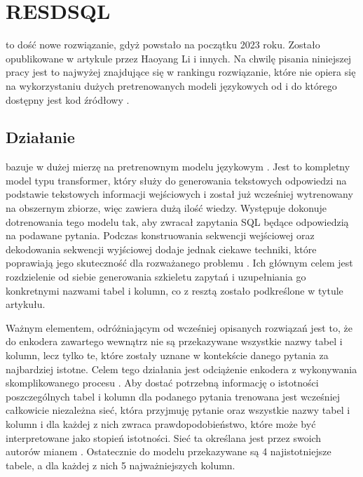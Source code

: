 \section{RESDSQL}
 to dość nowe rozwiązanie, gdyż powstało na początku 2023 roku. Zostało opublikowane w artykule  \cite{Li2023resdsql} przez Haoyang Li i innych. Na chwilę pisania niniejszej pracy jest to najwyżej znajdujące się w rankingu  rozwiązanie, które nie opiera się na wykorzystaniu dużych pretrenowanych modeli językowych od  i do którego dostępny jest kod źródłowy \cite{resdsql-repository}.

\subsection{Działanie}
 bazuje w dużej mierzę na pretrenownym modelu językowym  \cite{Raffel2019}. Jest to kompletny model typu transformer, który służy do generowania tekstowych odpowiedzi na podstawie tekstowych informacji wejściowych i został już wcześniej wytrenowany na obszernym zbiorze, więc zawiera dużą ilość wiedzy. Występuje   dokonuje dotrenowania tego modelu tak, aby zwracał zapytania SQL będące odpowiedzią na podawane pytania. Podczas konstruowania sekwencji wejściowej oraz dekodowania sekwencji wyjściowej dodaje jednak ciekawe techniki, które poprawiają jego skuteczność dla rozważanego problemu . Ich głównym celem jest rozdzielenie od siebie generowania szkieletu zapytań i uzupełniania go konkretnymi nazwami tabel i kolumn, co z resztą zostało podkreślone w tytule artykułu.

Ważnym elementem, odróżniającym  od wcześniej opisanych rozwiązań jest to, że do enkodera zawartego wewnątrz  nie są przekazywane wszystkie nazwy tabel i kolumn, lecz tylko te, które zostały uznane w kontekście danego pytania za najbardziej istotne. Celem tego działania jest odciążenie enkodera z wykonywania skomplikowanego procesu . Aby dostać potrzebną informację o istotności poszczególnych tabel i kolumn dla podanego pytania trenowana jest wcześniej całkowicie niezależna sieć, która przyjmuję pytanie oraz wszystkie nazwy tabel i kolumn i dla każdej z nich zwraca prawdopodobieństwo, które może być interpretowane jako stopień istotności. Sieć ta określana jest przez swoich autorów mianem . Ostatecznie do modelu  przekazywane są 4 najistotniejsze tabele, a dla każdej z nich 5 najważniejszych kolumn.

